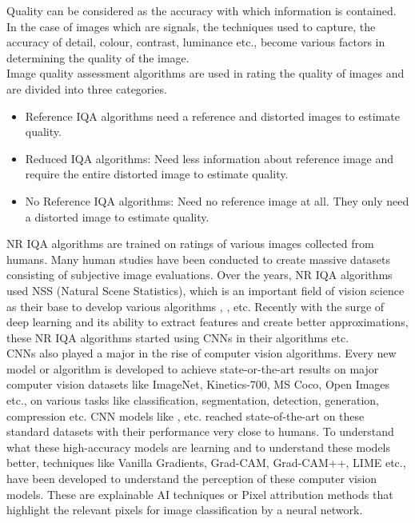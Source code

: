\documentclass[10pt,twocolumn,letterpaper]{article}
\begin{document}
Quality can be considered as the accuracy with which information is contained. In the case of images which are signals, the techniques used to capture, the accuracy of detail, colour, contrast, luminance etc., become various factors in determining the quality of the image.\\

Image quality assessment algorithms are used in rating the quality of images and are divided into three categories.
\begin{itemize}
    \setlength\itemsep{0.001em}
    \item Reference IQA algorithms need a reference and distorted images to estimate quality.
    \item Reduced IQA algorithms: Need less information about reference image and require the entire distorted image to estimate quality. 
    \item No Reference IQA algorithms: Need no reference image at all. They only need a distorted image to estimate quality.
\end{itemize}
NR IQA algorithms are trained on ratings of various images collected from humans. Many human studies have been conducted to create massive datasets consisting of subjective image evaluations. Over the years, NR IQA algorithms used NSS (Natural Scene Statistics), which is an important field of vision science \cite{NSS} as their base to develop various algorithms  \cite{DIIVINE}, \cite{BRISUQE}, \cite{NIQE} etc. Recently with the surge of deep learning and its ability to extract features and create better approximations, these NR IQA algorithms started using CNNs in their algorithms \cite{PaQ-2-PiQ} etc.\\

CNNs also played a major in the rise of computer vision algorithms. Every new model or algorithm is developed to achieve state-or-the-art results on major computer vision datasets like ImageNet, Kinetics-700, MS Coco, Open Images etc., on various tasks like classification, segmentation, detection, generation, compression etc. CNN models like \cite{InceptionNet}, \cite{ResNet} etc. reached state-of-the-art on these standard datasets with their performance very close to humans. To understand what these high-accuracy models are learning and to understand these models better, techniques like Vanilla Gradients, Grad-CAM, Grad-CAM++, LIME etc., have been developed to understand the perception of these computer vision models. These are explainable AI techniques or Pixel attribution methods that highlight the relevant pixels for image classification by a neural network.
\end{document}
